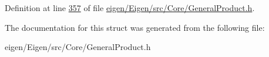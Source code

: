 Definition at line \hyperlink{eigen_2_eigen_2src_2_core_2_general_product_8h_source_l00357}{357} of file \hyperlink{eigen_2_eigen_2src_2_core_2_general_product_8h_source}{eigen/\+Eigen/src/\+Core/\+General\+Product.\+h}.



The documentation for this struct was generated from the following file\+:\begin{DoxyCompactItemize}
\item 
eigen/\+Eigen/src/\+Core/\+General\+Product.\+h\end{DoxyCompactItemize}
